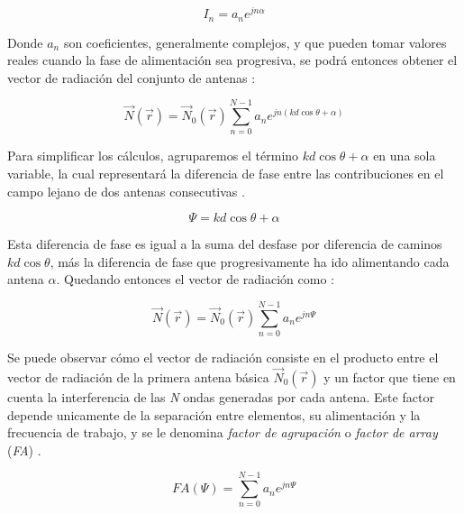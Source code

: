 \begin{equation}
	I_{n}=a_{n}e^{jn\alpha} 
	\label{eq:fasor}
\end{equation}

\par Donde $a_{n}$ son coeficientes, generalmente complejos, y que pueden tomar valores reales cuando la fase de alimentación sea progresiva, se podrá entonces
obtener el vector de radiación del conjunto de antenas \cite{Cardama2002}:

\begin{equation}
	\vec{N}\left ( \vec{r} \right )= \vec{N}_{0}\left ( \vec{r} \right )\sum_{n=0}^{N-1}a_{n}e^{jn(kd\cos\theta+\alpha)}
	\label{eq:vecrad}
\end{equation}

\par Para simplificar los cálculos, agruparemos el término $kd\cos\theta+\alpha$ en una sola variable, la cual representará la diferencia de fase entre las contribuciones en el campo lejano de dos antenas consecutivas \cite{Cardama2002}. 

\begin{equation}
	\Psi = kd\cos\theta+\alpha
	\label{eq:psi}
\end{equation}

\par Esta diferencia de fase es igual a la suma del desfase por diferencia de caminos $kd\cos\theta$, más la diferencia de fase que progresivamente ha ido alimentando cada antena $\alpha$. Quedando entonces el vector de radiación como \cite{Cardama2002}: 

\begin{equation}
	\vec{N}\left ( \vec{r} \right )= \vec{N}_{0}\left ( \vec{r} \right )\sum_{n=0}^{N-1}a_{n}e^{jn\Psi}
	\label{eq:vecrad2}
\end{equation}

\par Se puede observar cómo el vector de radiación consiste en el producto entre el vector de radiación de la primera antena básica $\vec{N}_{0}\left ( \vec{r} \right ) $ y un factor que tiene en cuenta la interferencia de las \textit{N} ondas generadas por cada antena. Este factor depende unicamente de la separación entre elementos, su alimentación y la frecuencia de trabajo, y se le denomina \textit{factor de agrupación} o \textit{factor de array} (\textit{FA}) \cite{Cardama2002}.

\begin{equation}
	FA(\Psi)=\sum_{n=0}^{N-1}a_{n}e^{jn\Psi}
	\label{eq:fa}
\end{equation}

